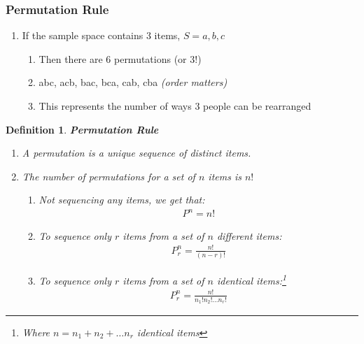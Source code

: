 \documentclass[../IND E 315.tex]{subfiles}
\newtheorem{defn}{Definition}
\begin{document}
\subsubsection*{Permutation Rule}
\begin{enumerate}
    \item If the sample space contains 3 items, $S = {a, b, c}$ 
    \begin{enumerate}
        \item Then there are 6 permutations (or 3!)
        \item abc, acb, bac, bca, cab, cba \emph{(order matters)}
        \item This represents the number of ways 3 people can be rearranged
    \end{enumerate} 
\end{enumerate}
\begin{defn}
    \textbf{Permutation Rule}
    \begin{enumerate}
        \item A permutation is a unique sequence of distinct items. 
        \item The number of permutations for a set of $n$ items is $n!$
            \begin{enumerate}
                \item Not sequencing any items, we get that:
                    \begin{equation*}
                        \begin{aligned}
                            P^n = n!
                        \end{aligned}
                    \end{equation*}
                \item To sequence only $r$ items from a set of $n$ \emph{different} items:
                    \begin{equation*}
                        \begin{aligned}
                            P^n_r = \frac{n!}{(n-r)!}
                        \end{aligned}
                    \end{equation*}
                \item To sequence only $r$ items from a set of $n$ \emph{identical} items:\footnote{Where $n = n_1 + n_2 + \dots n_r$  identical items}
                    \begin{equation*}
                        \begin{aligned}
                            P^n_r = \frac{n!}{n_1! n_2! \dots n_r!}
                        \end{aligned}
                    \end{equation*}

            \end{enumerate}
    \end{enumerate}    
\end{defn}
\end{document}
